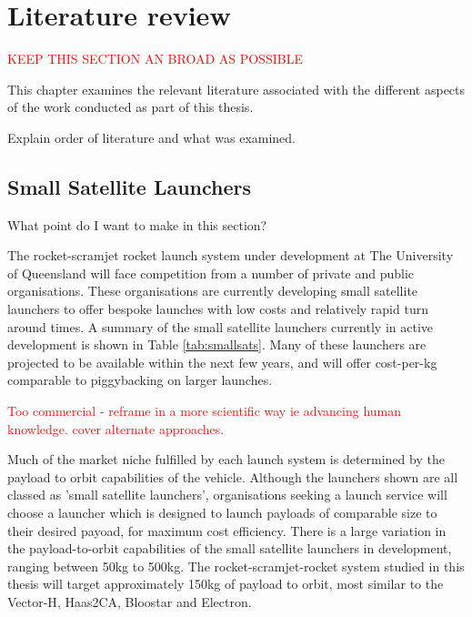 
\cleardoublepage
\chapter{Literature review}\label{chapter:literature-review}

\textcolor{red}{KEEP THIS SECTION AN BROAD AS POSSIBLE}


  This chapter examines the relevant literature associated with the different aspects of the work conducted as part of this thesis. 
  
  
 
  
 
  Explain order of literature and what was examined.
  
  
  
  
  \section{Small Satellite Launchers}
  
  What point do I want to make in this section?
  
  The rocket-scramjet rocket launch system under development at The University of Queensland will face competition from a number of private and public organisations.  
  These organisations are currently developing small satellite launchers to offer bespoke launches with low costs and relatively rapid turn around times. A summary of the small satellite launchers currently in active development is shown in Table \ref{tab:smallsats}. Many of these launchers are projected to be available within the next few years, and will offer cost-per-kg comparable to piggybacking on larger launches. 
  
\textcolor{red}{Too commercial - reframe in a more scientific way ie advancing human knowledge. cover alternate approaches.}
  
  Much of the market niche fulfilled by each launch system is determined by the payload to orbit capabilities of the vehicle. Although the launchers shown are all classed as 'small satellite launchers', organisations seeking a launch service will choose a launcher which is designed to launch payloads of comparable size to their desired payoad, for maximum cost efficiency. There is a large variation in the payload-to-orbit capabilities of the small satellite launchers in development, ranging between 50kg to 500kg. The rocket-scramjet-rocket system studied in this thesis will target approximately 150kg of payload to orbit, most similar to the Vector-H\cite{Vector}, Haas2CA\cite{ARCA}, Bloostar\cite{Bloostar}  and Electron\cite{Electron}. 
  
